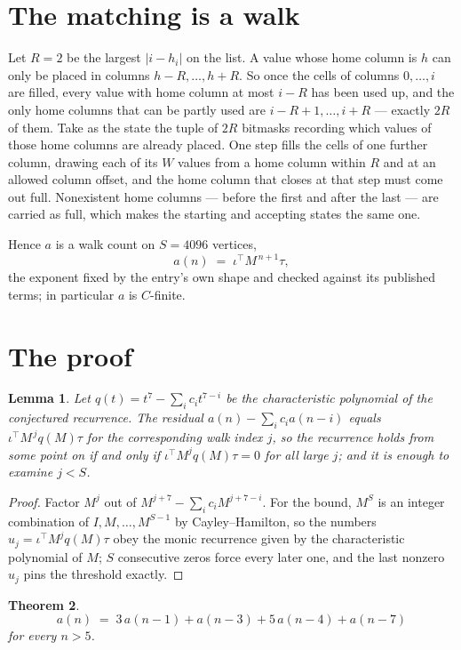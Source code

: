 \documentclass[11pt,a4paper]{article}
\theoremstyle{plain}
\newtheorem{theorem}{Theorem}
\newtheorem{lemma}[theorem]{Lemma}
\theoremstyle{definition}
\begin{document}
\section{The matching is a walk}

Let $R=2$ be the largest $|i-h_i|$ on the list. A value whose home column is $h$ can only be
placed in columns $h-R,\dots,h+R$. So once the cells of columns $0,\dots,i$ are filled, every
value with home column at most $i-R$ has been used up, and the only home columns that can be
partly used are $i-R+1,\dots,i+R$ --- exactly $2R$ of them. Take as the state the tuple of
$2R$ bitmasks recording which values of those home columns are already placed. One step fills
the cells of one further column, drawing each of its $W$ values from a home column within $R$
and at an allowed column offset, and the home column that closes at that step must come out
full. Nonexistent home columns --- before the first and after the last --- are carried as
full, which makes the starting and accepting states the same one.

Hence $a$ is a walk count on $S=4096$ vertices,
\[
a(n)\;=\;\iota^{\!\top}M^{\,n+1}\tau ,
\]
the exponent fixed by the entry's own shape and checked against its published terms; in
particular $a$ is $C$-finite.

\section{The proof}

\begin{lemma}\label{lem:crit}
Let $q(t)=t^{7}-\sum_i c_it^{7-i}$ be the characteristic polynomial of the
conjectured recurrence. The residual $a(n)-\sum_ic_ia(n-i)$ equals
$\iota^{\!\top}M^{\,j}q(M)\tau$ for the corresponding walk index $j$, so the recurrence
holds from some point on if and only if $\iota^{\!\top}M^{j}q(M)\tau=0$ for all large $j$;
and it is enough to examine $j<S$.
\end{lemma}

\begin{proof}
Factor $M^{j}$ out of $M^{j+7}-\sum_ic_iM^{j+7-i}$. For the bound, $M^{S}$
is an integer combination of $I,M,\dots,M^{S-1}$ by Cayley--Hamilton, so the numbers
$u_j=\iota^{\!\top}M^{j}q(M)\tau$ obey the monic recurrence given by the characteristic
polynomial of $M$; $S$ consecutive zeros force every later one, and the last nonzero $u_j$
pins the threshold exactly.
\end{proof}

\begin{theorem}
\[
a(n)\;=\;3\,a(n-1) + a(n-3) + 5\,a(n-4) + a(n-7)
\]
for every $n>5$.
\end{theorem}
\end{document}

